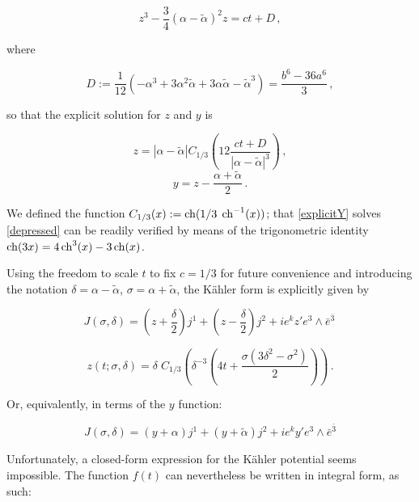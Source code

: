 \begin{equation}
	z^3 - \frac{3}4 (\alpha - \tilde\alpha)^2 z = ct + D\,,
	\label{depressed}
\end{equation}

where

\begin{equation}
	D := \frac{1}{12}(-\alpha^3 + 3 \alpha^2 \tilde\alpha + 3 \alpha\tilde{\alpha} - \tilde{\alpha}^3) = \frac{b^6-36a^6}{3}\,,
	\label{dprime}
\end{equation}

so that the explicit solution for $z$ and $y$ is

\begin{equation}
	z = |\alpha - \tilde \alpha| C_{1/3} \left( 12 \frac{ct + D}{|\alpha-\tilde\alpha|^3} \right) \,,
	\label{explicitz}
\end{equation}
\begin{equation}
	y = z - \frac{\alpha + \tilde{\alpha}}2 \,.
	\label{explicitY}
\end{equation}

We defined the function $C_{1/3}(x) := \operatorname{ch}(1/3 \; \operatorname{ch}^{-1}(x))$; that \ref{explicitY} solves \ref{depressed} can be readily verified by means of the trigonometric identity $\operatorname{ch}(3x) = 4 \operatorname{ch}^3(x) - 3 \operatorname{ch}(x)$.

Using the freedom to scale $t$ to fix $c=1/3$ for future convenience and introducing the notation $\delta = \alpha - \tilde{\alpha}$, $\sigma = \alpha + \tilde{\alpha}$, the K\"ahler form is explicitly given by

\begin{equation}
	J(\sigma,\delta) = \left(  z + \frac{\delta}{2}\right) j^1 + \left(z-\frac{\delta}{2}\right) j^2 + ie^k z' e^3 \wedge \bar e^{\bar 3}\,
	\label{}
\end{equation}

\begin{equation}
	z(t;\sigma,\delta) = \delta \;C_{1/3} \left( \delta^{-3} \left( 4t + \frac{\sigma(3\delta^2 - \sigma^2)}{2} \right) \right)\,.
	\label{}
\end{equation}

Or, equivalently, in terms of the $y$ function:

\begin{equation}
	J(\sigma,\delta) = (y+\alpha) j^1 + (y+\tilde{\alpha})j^2 + ie^k y' e^3 \wedge \bar e^{\bar 3}
	\label{}
\end{equation}

Unfortunately, a closed-form expression for the K\"ahler potential seems impossible. The function $f(t)$ can nevertheless be written in integral form, as such:

